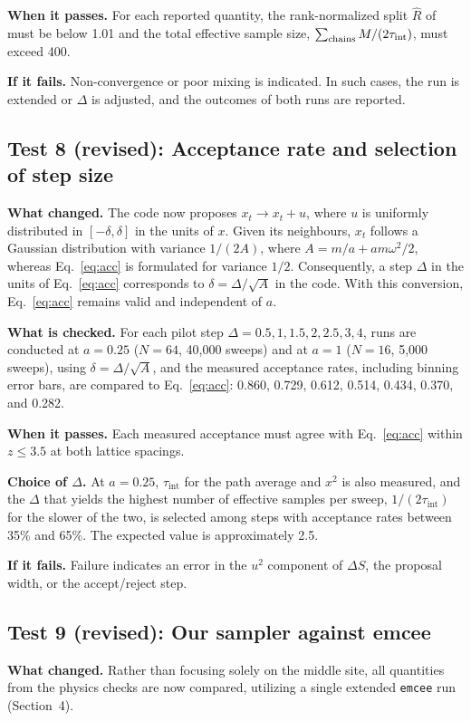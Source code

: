 \documentclass[11pt]{article}
\begin{document}
\textbf{When it passes.} For each reported quantity, the rank-normalized split $\hat R$ of~\cite{vehtari} must be below 1.01 and the total effective sample size, $\sum_{\rm chains} M/(2\tau_{\text{int}})$, must exceed 400.

\textbf{If it fails.} Non-convergence or poor mixing is indicated. In such cases, the run is extended or $\Delta$ is adjusted, and the outcomes of both runs are reported.

\subsection*{Test 8 (revised): Acceptance rate and selection of step size}
\textbf{What changed.} The code now proposes $x_t \to x_t + u$, where $u$ is uniformly distributed in $[-\delta, \delta]$ in the units of $x$. Given its neighbours, $x_t$ follows a Gaussian distribution with variance $1/(2A)$, where $A = m/a + am\omega^2/2$, whereas Eq.~\eqref{eq:acc} is formulated for variance $1/2$. Consequently, a step $\Delta$ in the units of Eq.~\eqref{eq:acc} corresponds to $\delta = \Delta/\sqrt{A}$ in the code. With this conversion, Eq.~\eqref{eq:acc} remains valid and independent of $a$.

\textbf{What is checked.} For each pilot step $\Delta = 0.5, 1, 1.5, 2, 2.5, 3, 4$, runs are conducted at $a = 0.25$ ($N = 64$, 40,000 sweeps) and at $a = 1$ ($N = 16$, 5,000 sweeps), using $\delta = \Delta/\sqrt{A}$, and the measured acceptance rates, including binning error bars, are compared to Eq.~\eqref{eq:acc}: 0.860, 0.729, 0.612, 0.514, 0.434, 0.370, and 0.282.

\textbf{When it passes.} Each measured acceptance must agree with Eq.~\eqref{eq:acc} within $z \le 3.5$ at both lattice spacings.

\textbf{Choice of $\Delta$.} At $a = 0.25$, $\tau_{\text{int}}$ for the path average and $x^2$ is also measured, and the $\Delta$ that yields the highest number of effective samples per sweep, $1/(2\tau_{\text{int}})$ for the slower of the two, is selected among steps with acceptance rates between 35\% and 65\%. The expected value is approximately 2.5.

\textbf{If it fails.} Failure indicates an error in the $u^2$ component of $\Delta S$, the proposal width, or the accept/reject step.

\subsection*{Test 9 (revised): Our sampler against emcee}
\textbf{What changed.} Rather than focusing solely on the middle site, all quantities from the physics checks are now compared, utilizing a single extended \texttt{emcee} run (Section~4).
\end{document}
